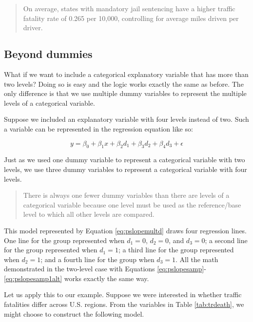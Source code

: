 \documentclass[
]{book}
\begin{document}
\begin{quote}
On average, states with mandatory jail sentencing have a higher traffic fatality rate of 0.265 per 10,000, controlling for average miles driven per driver.
\end{quote}

\hypertarget{beyond-dummies}{%
\subsection{Beyond dummies}\label{beyond-dummies}}

What if we want to include a categorical explanatory variable that has more than two levels? Doing so is easy and the logic works exactly the same as before. The only difference is that we use multiple dummy variables to represent the multiple levels of a categorical variable.

Suppose we included an explanatory variable with four levels instead of two. Such a variable can be represented in the regression equation like so:

\begin{equation}
y = \beta_0 + \beta_1x + \beta_2d_1 + \beta_3d_2 + \beta_4d_3 + \epsilon
\label{eq:pslopemultd}
\end{equation}

Just as we used one dummy variable to represent a categorical variable with two levels, we use three dummy variables to represent a categorical variable with four levels.

\begin{quote}
There is always one fewer dummy variables than there are levels of a categorical variable because one level must be used as the reference/base level to which all other levels are compared.
\end{quote}

This model represented by Equation \eqref{eq:pslopemultd} draws four regression lines. One line for the group represented when \(d_1=0\), \(d_2=0\), and \(d_3=0\); a second line for the group represented when \(d_1=1\); a third line for the group represented when \(d_2=1\); and a fourth line for the group when \(d_3=1\). All the math demonstrated in the two-level case with Equations \eqref{eq:pslopesamp}-\eqref{eq:pslopesamp1alt} works exactly the same way.

Let us apply this to our example. Suppose we were interested in whether traffic fatalities differ across U.S. regions. From the variables in Table \ref{tab:trdeath}, we might choose to construct the following model.
\end{document}
